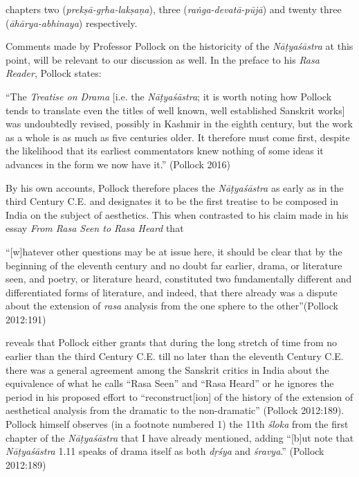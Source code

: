 chapters two (\textsl{prekṣā-gṛha-lakṣaṇa}), three (\textsl{raṅga-devatā-pūjā}) and twenty three (\textsl{āhārya-abhinaya}) respectively. 

Comments made by Professor Pollock on the historicity of the \textsl{Nāṭyaśāstra} at this point, will be relevant to our discussion as well. In the preface to his \textsl{Rasa Reader}, Pollock states:

\begin{myquote}
“The \textsl{Treatise on Drama} [i.e. the \textsl{Nāṭyaśāstra}; it is worth noting how Pollock tends to translate even the titles of well known, well established Sanskrit works] was undoubtedly revised, possibly in Kashmir in the eighth century, but the work as a whole is as much as five centuries older. It therefore must come first, despite the likelihood that its earliest commentators knew nothing of some ideas it advances in the form we now have it.” 
\hfill (Pollock 2016) 
\end{myquote}

By his own accounts, Pollock therefore places the \textsl{Nāṭyaśāstra} as early as in the third Century C.E. and designates it to be the first treatise to be composed in India on the subject of aesthetics. This when contrasted to his claim made in his essay \textsl{From Rasa Seen to Rasa Heard} that 

\begin{myquote}
“[w]hatever other questions may be at issue here, it should be clear that by the beginning of the eleventh century and no doubt far earlier, drama, or literature seen, and poetry, or literature heard, constituted two fundamentally different and differentiated forms of literature, and indeed, that there already was a dispute about the extension of \textsl{rasa} analysis from the one sphere to the other”\hfill (Pollock 2012:191) 
\end{myquote}

reveals that Pollock either grants that during the long stretch of time from no earlier than the third Century C.E. till no later than the eleventh Century C.E. there was a general agreement among the Sanskrit critics in India about the equivalence of what he calls “Rasa Seen” and “Rasa Heard” or he ignores the period in his proposed effort to “reconstruct[ion] of the history of the extension of aesthetical analysis from the dramatic to the non-dramatic” (Pollock 2012:189). Pollock himself observes (in a footnote numbered 1) the 11th \textsl{śloka} from the first chapter of the \textsl{Nāṭyaśāstra} that I have already mentioned, adding “[b]ut note that \textsl{Nāṭyaśāstra} 1.11 speaks of drama itself as both \textsl{dṛśya} and \textsl{śravya}.” (Pollock 2012:189) 

